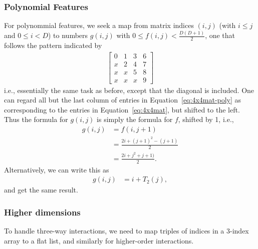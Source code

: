 \documentclass{article} %
\begin{document}
\subsubsection{Polynomial Features}
For polynommial features, we seek a map from matrix indices $(i, j)$ (with $i \le j$ and $0 \le i < D$) to numbers $g(i, j)$ with $0 \le f(i, j) < \frac{D(D+1)}{2}$, one that follows the pattern indicated by 
\begin{align}
\begin{bmatrix}
 0 & 1 & 3 & 6 \\
 x & 2 & 4 & 7\\
 x & x & 5 & 8 \\
 x & x & x & 9
\end{bmatrix}
\label{eq:4x4mat-poly}
\end{align}
i.e., essentially the same task as before, except that the diagonal is included. One can regard all but the last column of entries in Equation~\ref{eq:4x4mat-poly} as corresponding to the entries in Equation~\ref{eq:4x4mat}, but shifted to the left. Thus the formula for $g(i, j)$ is simply the formula for $f$, shifted by 1, i.e., 
\begin{align}
g(i, j) &= f(i, j+1)  \\
&=  \frac{2i + (j+1)^2-(j+1)}{2}\\
&=  \frac{2i + j^2 + j + 1)}{2}.
\end{align}
Alternatively, we can write this as
\begin{align}
g(i, j) &= i + T_2(j),
\end{align}
\noindent
and get the same result. 


\subsubsection{Higher dimensions}
To handle three-way interactions, we need to map triples of indices in a 3-index array to a flat list, and similarly for higher-order interactions. 
\end{document}
